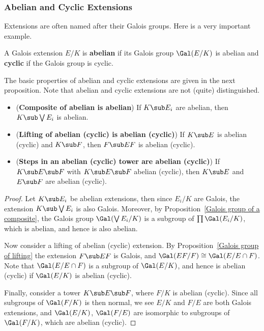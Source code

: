 \subsubsection{Abelian and Cyclic Extensions}
Extensions are often named after their Galois groups. Here is a very important example.
\begin{definition}
A Galois extension $E/K$ is \textbf{abelian} if its Galois group $\Gal(E/K)$ is abelian and \textbf{cyclic} if the Galois group is cyclic.
\end{definition}
The basic properties of abelian and cyclic extensions are given in the next proposition. Note that abelian and cyclic extensions are not (quite) distinguished.
\begin{proposition}\label{field ext abelian cyclic prop}
\mbox{}
\begin{itemize}
\item (\textbf{Composite of abelian is abelian}) If $K\sub E_i$ are abelian, then $K\sub\bigvee E_i$ is abelian.
\item (\textbf{Lifting of abelian (cyclic) is abelian (cyclic)}) If $K\sub E$ is abelian (cyclic) and $K\sub F$, then $F\sub EF$ is abelian (cyclic).
\item (\textbf{Steps in an abelian (cyclic) tower are abelian (cyclic)}) If $K\sub E\sub F$ with $K\sub E\sub F$ abelian (cyclic), then $K\sub E$ and $E\sub F$ are abelian (cyclic).
\end{itemize}
\end{proposition}
\begin{proof}
Let $K\sub E_i$ be abelian extensions, then since $E_i/K$ are Galois, the extension $K\sub\bigvee E_i$ is also Galois. Moreover, by Proposition~\ref{Galois group of a composite}, the Galois group $\Gal(\bigvee E_i/K)$ is a subgroup of $\prod\Gal(E_i/K)$, which is abelian, and hence is also abelian.\par
Now consider a lifting of abelian (cyclic) extension. By Proposition~\ref{Galois group of lifting} the extension $F\sub EF$ is Galois, and $\Gal(EF/F)\cong\Gal(E/E\cap F)$. Note that $\Gal(E/E\cap F)$ is a subgroup of $\Gal(E/K)$, and hence is abelian (cyclic) if $\Gal(E/K)$ is abelian (cyclic).\par
Finally, consider a tower $K\sub E\sub F$, where $F/K$ is abelian (cyclic). Since all subgroups of $\Gal(F/K)$ is then normal, we see $E/K$ and $F/E$ are both Galois extensions, and $\Gal(E/K)$, $\Gal(F/E)$ are isomorphic to subgroups of $\Gal(F/K)$, which are abelian (cyclic).
\end{proof}
